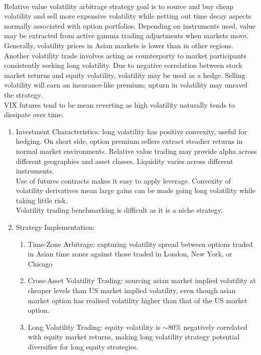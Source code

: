 \begin{remark} \\
Relative value volatility arbitrage strategy goal is to source and buy cheap volatility and sell more expensive volatility while netting out time decay aspects normally associated with option portfolios. Depending on instruments used, value may be extracted from active gamma trading adjustments when markets move.\\
Generally, volatility prices in Asian markets is lower than in other regions.\\
Another volatility trade involves acting as counterparty to market participants consistently seeking long volatility. Due to negative correlation between stock market returns and equity volatility, volatility may be used as a hedge. Selling volatility will earn an insurance-like premium; upturn in volatility may unravel the strategy.\\
VIX futures tend to be mean reverting as high volatility naturally tends to dissipate over time.
\begin{enumerate}[label=\roman*.]
\setlength{\itemsep}{0pt}
\item Investment Characteristics: long volatility has positive convexity, useful for hedging. On short side, option premium sellers extract steadier returns in normal market environments. Relative value trading may provide alpha across different geographies and asset classes. Liquidity varies across different instruments.\\
Use of futures contracts makes it easy to apply leverage. Convexity of volatility derivatives mean large gains can be made going long volatility while taking little risk.\\
Volatility trading benchmarking is difficult as it is a niche strategy.
\item Strategy Implementation:
\begin{enumerate}[label=\arabic*.]
\setlength{\itemsep}{0pt}
\item Time-Zone Arbitrage: capturing volatility spread between options traded in Asian time zones against those traded in London, New York, or Chicago
\item Cross-Asset Volatility Trading: sourcing asian market implied volatility at cheaper levels than US market implied volatility, even though asian market option has realised volatility higher than that of the US market option.
\item Long Volatility Trading: equity volatility is $\sim 80\%$ negatively correlated with equity market returns, making long volatility strategy potential diversifier for long equity strategies.

\end{enumerate}
\end{enumerate}
\end{remark}
